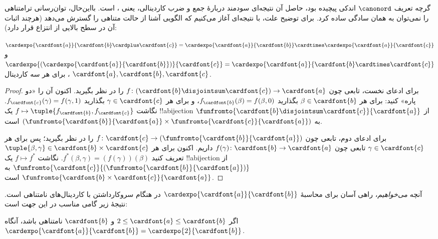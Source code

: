 \documentclass[../../../include/open-logic-section]{subfiles}
\begin{document}


گرچه تعریف $\canonord$ اندکی پیچیده بود، حاصل آن نتیجه‌ای سودمند دربارهٔ
جمع و ضرب کاردینالی، یعنی ، است. بااین‌حال،
توان‌رسانی ترامتناهی را نمی‌توان به همان سادگی ساده کرد. برای توضیح علت،
با نتیجه‌ای آغاز می‌کنیم که الگویی آشنا از حالت متناهی را گسترش می‌دهد
(هرچند اثبات آن در سطح بالایی از انتزاع قرار دارد):

\begin{prop}
$\cardexpo{\cardfont{a}}{\cardfont{b} \cardplus \cardfont{c}} =
\cardexpo{\cardfont{a}}{\cardfont{b}} \cardtimes
\cardexpo{\cardfont{a}}{\cardfont{c}}$ و
$\cardexpo{(\cardexpo{\cardfont{a}}{\cardfont{b}})}{\cardfont{c}} =
\cardexpo{\cardfont{a}}{\cardfont{b} \cardtimes \cardfont{c}}$، برای
هر سه کاردینال $\cardfont{a}, \cardfont{b}, \cardfont{c}$.
\end{prop}

\begin{proof}
برای ادعای نخست، تابعی چون $f \colon
(\cardfont{b}\disjointsum\cardfont{c}) \to \cardfont{a}$ را در نظر
بگیرید. اکنون آن را «دو پاره» کنید: برای هر
$\beta \in \cardfont{b}$ بگذارید $f_\cardfont{b}(\beta) = f(\beta, 0)$،
و برای هر $\gamma \in \cardfont{c}$ بگذارید
$f_\cardfont{c}(\gamma) = f(\gamma, 1)$. نگاشت
$f \mapsto \tuple{f_{\cardfont{b}}, f_{\cardfont{c}}}$ یک !!a{bijection}
از $\funfromto{\cardfont{b} \disjointsum \cardfont{c}}{\cardfont{a}}$ به
$(\funfromto{\cardfont{b}}{\cardfont{a}} \times
\funfromto{\cardfont{c}}{\cardfont{a}})$ است.

برای ادعای دوم، تابعی چون $f \colon \cardfont{c} \to
(\funfromto{\cardfont{b}}{\cardfont{a}})$ را در نظر بگیرید؛ پس برای هر
$\gamma \in \cardfont{c}$ تابعی چون
$f(\gamma) \colon \cardfont{b} \to \cardfont{a}$ داریم. اکنون برای هر
$\tuple{\beta, \gamma} \in \cardfont{b} \times \cardfont{c}$ تعریف کنید
$f^*(\beta, \gamma) = (f(\gamma))(\beta)$. نگاشت $f \mapsto f^*$ یک
!!a{bijection} از
$\funfromto{\cardfont{c}}{(\funfromto{\cardfont{b}}{\cardfont{a}})}$
به $\funfromto{\cardfont{b} \times \cardfont{c}}{\cardfont{a}}$ است.
\end{proof}

آنچه \emph{می‌خواهیم}، راهی آسان برای محاسبهٔ
$\cardexpo{\cardfont{a}}{\cardfont{b}}$ در هنگام سروکارداشتن با
کاردینال‌های نامتناهی است. نتیجهٔ زیر گامی مناسب در این جهت است:

\begin{prop}
اگر $2 \leq \cardfont{a} \leq \cardfont{b}$ و $\cardfont{b}$ نامتناهی
باشد، آنگاه $\cardexpo{\cardfont{a}}{\cardfont{b}} =
\cardexpo{2}{\cardfont{b}}$.
\end{prop}
\end{document}
